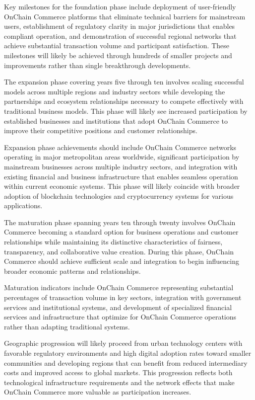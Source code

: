 \documentclass[
  Letterpaper,
]{scrbook}
\begin{document}
Key milestones for the foundation phase include deployment of
user-friendly OnChain Commerce platforms that eliminate technical
barriers for mainstream users, establishment of regulatory clarity in
major jurisdictions that enables compliant operation, and demonstration
of successful regional networks that achieve substantial transaction
volume and participant satisfaction. These milestones will likely be
achieved through hundreds of smaller projects and improvements rather
than single breakthrough developments.

The expansion phase covering years five through ten involves scaling
successful models across multiple regions and industry sectors while
developing the partnerships and ecosystem relationships necessary to
compete effectively with traditional business models. This phase will
likely see increased participation by established businesses and
institutions that adopt OnChain Commerce to improve their competitive
positions and customer relationships.

Expansion phase achievements should include OnChain Commerce networks
operating in major metropolitan areas worldwide, significant
participation by mainstream businesses across multiple industry sectors,
and integration with existing financial and business infrastructure that
enables seamless operation within current economic systems. This phase
will likely coincide with broader adoption of blockchain technologies
and cryptocurrency systems for various applications.

The maturation phase spanning years ten through twenty involves OnChain
Commerce becoming a standard option for business operations and customer
relationships while maintaining its distinctive characteristics of
fairness, transparency, and collaborative value creation. During this
phase, OnChain Commerce should achieve sufficient scale and integration
to begin influencing broader economic patterns and relationships.

Maturation indicators include OnChain Commerce representing substantial
percentages of transaction volume in key sectors, integration with
government services and institutional systems, and development of
specialized financial services and infrastructure that optimize for
OnChain Commerce operations rather than adapting traditional systems.

Geographic progression will likely proceed from urban technology centers
with favorable regulatory environments and high digital adoption rates
toward smaller communities and developing regions that can benefit from
reduced intermediary costs and improved access to global markets. This
progression reflects both technological infrastructure requirements and
the network effects that make OnChain Commerce more valuable as
participation increases.
\end{document}
